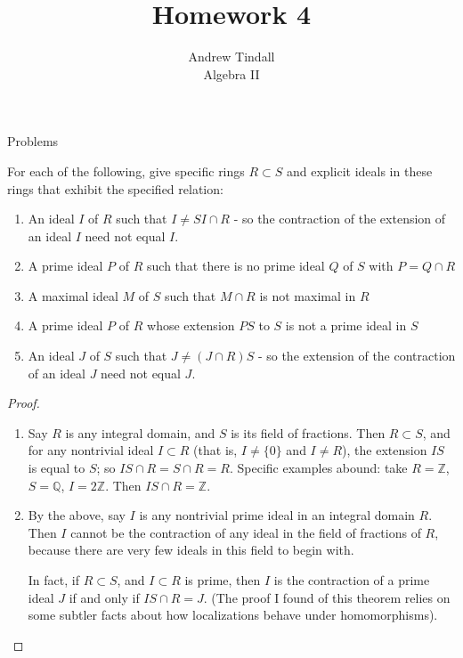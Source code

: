 \documentclass[12pt]{article}
\newcommand{\Q}{\mathbb{Q}}
\newcommand{\Z}{\mathbb{Z}}
\theoremstyle{definition}
\newenvironment{problem}[2][Problem]{\begin{trivlist}
\item[\hskip \labelsep {\bfseries #1}\hskip \labelsep {\bfseries #2.}]}{\end{trivlist}}
\begin{document}
 
 
\title{Homework 4}
\author{Andrew Tindall\\
	Algebra II}
 
\maketitle
\begin{section}{Problems}
\begin{problem}{1}
For each of the following, give specific rings $R \subset S$ and explicit ideals in these rings that exhibit the specified relation:
\begin{enumerate}[label=(\alph*)]
    \item An ideal $I$ of $R$ such that $I \neq SI \cap R$ - so the contraction of the extension of an ideal $I$ need not equal $I$.
    \item A prime ideal $P$ of $R$ such that there is no prime ideal $Q$ of $S$ with $P = Q \cap R$
    \item A maximal ideal $M$ of $S$ such that $M \cap R$ is not maximal in $R$
    \item A prime ideal $P$ of $R$ whose extension $PS$ to $S$ is not a prime ideal in $S$
    \item An ideal $J$ of $S$ such that $J \neq (J \cap R)S$ - so the extension of the contraction of an ideal $J$ need not equal $J$.
\end{enumerate}
\end{problem}
\begin{proof}
\begin{enumerate}[label=(\alph*)]
    \item Say $R$ is any integral domain, and $S$ is its field of fractions. Then $R \subset S$, and for any nontrivial ideal $I \subset R$ (that is, $I \neq \{0\}$ and $I \neq R$),  the extension $IS$ is equal to $S$; so $IS \cap R = S \cap R = R$. Specific examples abound: take $R = \Z$, $S = \Q$, $I = 2\Z$. Then $IS \cap R = \Z$.
    \item By the above, say $I$ is any nontrivial prime ideal in an integral domain $R$. Then $I$ cannot be the contraction of any ideal in the field of fractions of $R$, because there are very few ideals in this field to begin with.
	    \par In fact, if $R \subset S$, and $I \subset R$ is prime, then $I$ is the contraction of a prime ideal $J$ if and only if  $I S \cap R = J$. (The proof I found of this theorem relies on some subtler facts about how localizations behave under homomorphisms).

\end{enumerate}
\end{proof}
\end{section}
\end{document}
